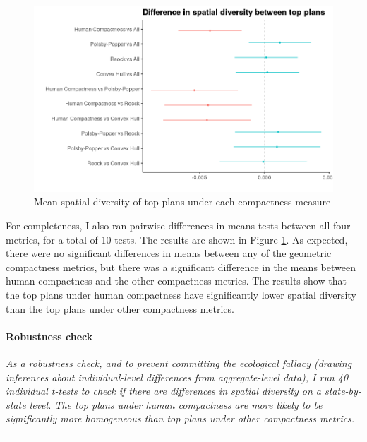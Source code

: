 \documentclass[]{article}
\let\oldparagraph\paragraph
\renewcommand{\paragraph}[1]{\oldparagraph{#1}\mbox{}}
\begin{document}
\begin{figure}
\centering
\includegraphics{../30_results/diff_in_means.png}
\caption{Mean spatial diversity of top plans under each compactness
measure \label{diff_in_means}}
\end{figure}

For completeness, I also ran pairwise differences-in-means tests between
all four metrics, for a total of 10 tests. The results are shown in
Figure \ref{diff_in_means}. As expected, there were no significant
differences in means between any of the geometric compactness metrics,
but there was a significant difference in the means between human
compactness and the other compactness metrics. The results show that the
top plans under human compactness have significantly lower spatial
diversity than the top plans under other compactness metrics.

\hypertarget{robustness-check-2}{%
\paragraph{Robustness check}\label{robustness-check-2}}

\textsl{As a robustness check, and to prevent committing the ecological fallacy
(drawing inferences about individual-level differences from aggregate-level
data), I run 40 individual t-tests to check if there are differences in spatial
diversity on a state-by-state level. The top plans under human compactness are
more likely to be significantly more homogeneous than top plans under other
compactness metrics.}

\begin{center}\rule{0.5\linewidth}{\linethickness}\end{center}
\end{document}
